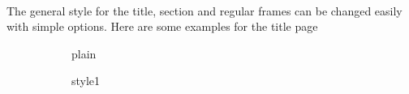 \begin{frame}[fragile=singleslide]{\insertsectionhead}
  \framesubtitle{\insertsubsectionhead}
  The general style for the title, section and regular frames can be changed
  easily with simple options. Here are some examples for the title page
  \begin{figure}[ht!]
    \begin{subfigure}[b]{0.3\textwidth}
      \caption*{plain}
    \end{subfigure}
    \hspace{\fill}
    \begin{subfigure}[b]{0.3\textwidth}
      \caption*{style1}
    \end{subfigure}
    \hspace{\fill}
    \begin{subfigure}[b]{0.3\textwidth}

\end{subfigure}
\end{figure}
\end{frame}
